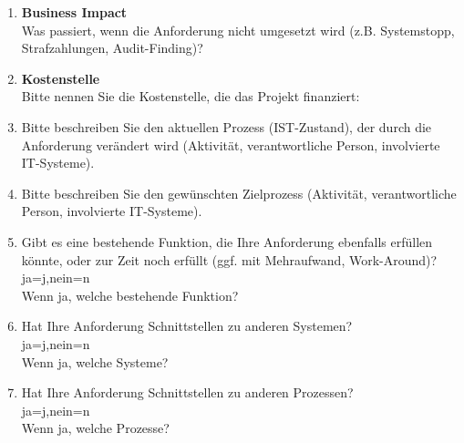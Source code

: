 \begin{Form}
\begin{enumerate}
  	\item \textbf{Business Impact} \\
  	Was passiert, wenn die Anforderung nicht umgesetzt wird (z.B. Systemstopp, Strafzahlungen, Audit-Finding)?   \\
  	\TextField[multiline, name=business,width=0.9\textwidth,  height=2cm, value={}]{}
  	
  	\item \textbf{Kostenstelle} \\ 
  	Bitte nennen Sie die Kostenstelle, die das Projekt finanziert: \TextField[name=costen, width=3.5cm, value={}]{}
  	
  	\item Bitte beschreiben Sie den aktuellen Prozess (IST-Zustand), der durch die Anforderung verändert wird (Aktivität, verantwortliche Person, involvierte IT-Systeme). \\
  	\TextField[multiline, name=proces,width=0.9\textwidth,  height=2cm, value={}]{}
  
  \item Bitte beschreiben Sie den gewünschten Zielprozess (Aktivität, verantwortliche Person, involvierte IT-Systeme). \\ 
  \TextField[multiline, name=descrgoal,width=0.9\textwidth,  height=2cm, value={}]{}

	\item Gibt es eine bestehende Funktion, die Ihre Anforderung ebenfalls erfüllen könnte, oder zur Zeit noch erfüllt (ggf. mit Mehraufwand, Work-Around)? \\ 
	\ChoiceMenu[radio, radiosymbol=6 default=n, width=0.5cm, name=func]{} {ja=j,nein=n} \\
	Wenn ja, welche bestehende Funktion? \\
	\TextField[multiline, name=jfunc,width=0.9\textwidth,  height=2cm, value={}]{}

	\newpage

	\item Hat Ihre Anforderung Schnittstellen zu anderen Systemen? \\ 
	\ChoiceMenu[radio, radiosymbol=6 default=n, width=0.5cm, name=consesyst]{} {ja=j,nein=n} \\
	Wenn ja, welche Systeme? \\
	\TextField[multiline, name=jconsesyst,width=0.9\textwidth,  height=2cm, value={}]{}
	
	\item Hat Ihre Anforderung Schnittstellen zu anderen Prozessen? \\ 
	\ChoiceMenu[radio, radiosymbol=6 default=n, width=0.5cm, name=consepro]{} {ja=j,nein=n} \\
	Wenn ja, welche Prozesse? \\
	\TextField[multiline, name=jconsepro,width=0.9\textwidth,  height=2cm, value={}]{}
	

\end{enumerate}
\end{Form}
